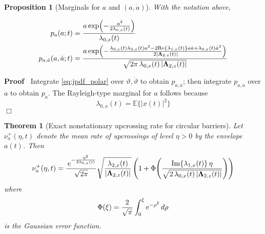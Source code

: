 \documentclass{article}
\newcommand{\tmmathbf}[1]{\ensuremath{\boldsymbol{#1}}}
\newenvironment{proof}{\noindent\textbf{Proof\ }}{\hspace*{\fill}$\Box$\medskip}
\newtheorem{proposition}{Proposition}
\newtheorem{theorem}{Theorem}
\begin{document}
\begin{proposition}
  [Marginals for $a$ and $(a, \dot{a})$]\label{prop:marginals} With the
  notation above,
  
  \begin{align}
    p_a (a ; t) & = \frac{a \exp \hspace{-0.17em} \left( - \frac{a^2}{2
    \lambda_{0, x} (t)} \right)}{\lambda_{0, x} (t)}  \\
    p_{a, \dot{a}} (a, \dot{a} ; t) & = \frac{a \exp \hspace{-0.17em} \left( -
    \frac{\lambda_{0, x} (t) \lambda_{2, x} (t) a^2 - 2 \mathrm{Re}
    \{\lambda_{1, x} (t)\}a \dot{a} + \lambda_{0, x} (t)
    \dot{a}^2}{2|\tmmathbf{\Lambda}_{2, z} (t) |} \right)}{\sqrt{2 \pi
    \hspace{0.17em} \lambda_{0, x} (t) \hspace{0.17em} |\tmmathbf{\Lambda}_{2,
    z} (t) |}} 
  \end{align}
\end{proposition}

\begin{proof}
  Integrate \eqref{eq:jpdf_polar} over $\vartheta, \dot{\vartheta}$ to obtain
  $p_{a, \dot{a}}$; then integrate $p_{a, \dot{a}}$ over $\dot{a}$ to obtain
  $p_a$. The Rayleigh-type marginal for $a$ follows because
  \begin{equation}
    \lambda_{0, x} (t) =\mathbb{E} \{|x (t) |^2 \}
  \end{equation}
\end{proof}

\begin{theorem}
  [Exact nonstationary upcrossing rate for circular
  barriers]\label{thm:upcrossing} Let $\nu_a^+ (\eta, t)$ denote the mean rate
  of upcrossings of level $\eta > 0$ by the envelope $a (t)$. Then
  \begin{equation}
    \label{eq:nu_final} \nu_a^+ (\eta, t) = \frac{\hspace{0.17em} e^{-
    \frac{\eta^2}{2 \lambda_{0, x} (t)}}}{\sqrt{2 \pi}} 
    \sqrt{\frac{\lambda_{2, x} (t)}{|\tmmathbf{\Lambda}_{2, z} (t) |}}  \left(
    1 + \Phi \hspace{-0.17em} \left( \frac{\mathrm{Im} \{\lambda_{1, x} (t)\}
    \hspace{0.17em} \eta}{\sqrt{2 \hspace{0.17em} \lambda_{0, x} (t)
    \hspace{0.17em} |\tmmathbf{\Lambda}_{2, z} (t) |}} \right) \right)
  \end{equation}
  where
  \begin{equation}
    \Phi (\xi) = \frac{2}{\sqrt{\pi}}  \int_0^{\xi} e^{- \rho^2} 
    \hspace{0.17em} d \rho
  \end{equation}
  is the Gaussian error function.
\end{theorem}
\end{document}
